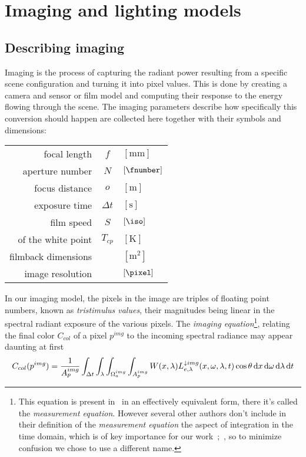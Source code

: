 
\chapter{Imaging and lighting models}\label{ch:lighting}
\section{Describing imaging}\label{ch:imaging}

Imaging is the process of capturing the \gls{radiant power} resulting 
from a specific \gls{scene} configuration and turning it into pixel values. 
This is done by creating a camera and sensor or film model and computing 
their response to the energy flowing through the scene.
The imaging parameters describe how specifically this conversion should happen 
are collected here together with their symbols and dimensions:

\vskip 2mm
\begin{center}
\begin{tabular}{r c l}
	focal length        & $f$ & $[\unit{\milli\meter}]$ \\
	aperture number     & $N$ & $[\unit{\fnumber}]$ \\
	focus distance      & $o$ & $[\unit{\meter}]$ \\
	exposure time       & $\Delta t$ & $[\unit{\second}]$ \\
	film speed          & $S$ & $[\unit{\iso}]$ \\
	\glsname{CCT} of the white point & $T_{cp}$ & $[\unit{\kelvin}]$ \\
	filmback dimensions &     & $[\unit{\square\meter}]$ \\
	image resolution    &     & $[\unit{\pixel}]$
\end{tabular}
\end{center}

\vskip 2mm

In our imaging model, the pixels in the image are triples of
floating point numbers, known as \textsl{\gls{tristimulus values}}, their
magnitudes being linear in the spectral radiant \gls{exposure} of the various
pixels. 
The \textsl{\gls{imaging equation}}\footnote{
	This equation is present in~\cite[Eq. 1]{kolb95} in an effectively equivalent form,
	there it's called the \emph{measurement equation}. 
	However several other authors don't include in their definition of the
	\emph{measurement equation} the aspect of integration in the time domain, which is
	of key importance for our work~\cite[p. 45, Eq 2.33]{dutre2003};~\cite{pharr2023}, so to minimize confusion we chose to use a different name. 
}, relating the final color $C_{col}$ of a pixel
$p^{img}$ to the incoming \gls{spectral} \gls{radiance} may appear daunting at first
\begin{equation}\label{eqn:imaging1}
	C_{col}(p^{img})  = \frac1{A_p^{img}}
	\int_{\Delta t} \int_{\lambda} \int_{\Omega^{img}_a} \int_{A_p^{img}}
	  W(x, \lambda) L^{\downarrow
		img}_{e,\lambda}(x, \omega, \lambda, t) \cos\theta\mathop{}\!\mathrm{d} x\mathop{}\!\mathrm{d}\omega\mathop{}\!\mathrm{d}\lambda\mathop{}\!\mathrm{d} t
\end{equation}

